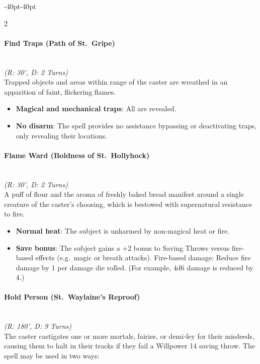 \documentclass{book}
\providecommand{\tightlist}{%
\setlength{\itemsep}{0pt}\setlength{\parskip}{0pt}}
\begin{document}
\begin{adjustwidth}{-40pt}{-40pt}
\begin{multicols}{2}
\paragraph{Find Traps (Path of
	St.~Gripe)}\label{find-traps-path-of-st.-gripe}\mbox{}\\
\emph{(R: 30', D: 2 Turns)}\\
Trapped objects and areas within range of the caster are wreathed in an
apparition of faint, flickering flames.

\begin{itemize}
	\tightlist
	\item
	\textbf{Magical and mechanical traps}: All are revealed.
	\item
	\textbf{No disarm}: The spell provides no assistance bypassing or
	deactivating traps, only revealing their locations.
\end{itemize}

\paragraph{Flame Ward (Boldness of
	St.~Hollyhock)}\label{flame-ward-boldness-of-st.-hollyhock}\mbox{}\\
\emph{(R: 30', D: 2 Turns)}\\
A puff of flour and the aroma of freshly baked bread manifest around a
single creature of the caster's choosing, which is bestowed with
supernatural resistance to fire.

\begin{itemize}
	\tightlist
	\item
	\textbf{Normal heat}: The subject is unharmed by non-magical heat or
	fire.
	\item
	\textbf{Save bonus}: The subject gains a +2 bonus to Saving Throws
	versus fire-based effects (e.g.~magic or breath attacks). Fire-based
	damage: Reduce fire damage by 1 per damage die rolled. (For example,
	4d6 damage is reduced by 4.)
\end{itemize}

\paragraph{Hold Person (St.~Waylaine's
	Reproof)}\label{hold-person-st.-waylaines-reproof}\mbox{}\\
\emph{(R: 180', D: 9 Turns)}\\
The caster castigates one or more mortals, fairies, or demi-fey for
their misdeeds, causing them to halt in their tracks if they fail a
Willpower 14 saving throw. The spell may be used in two ways:


\end{multicols}
\end{adjustwidth}
\end{document}
